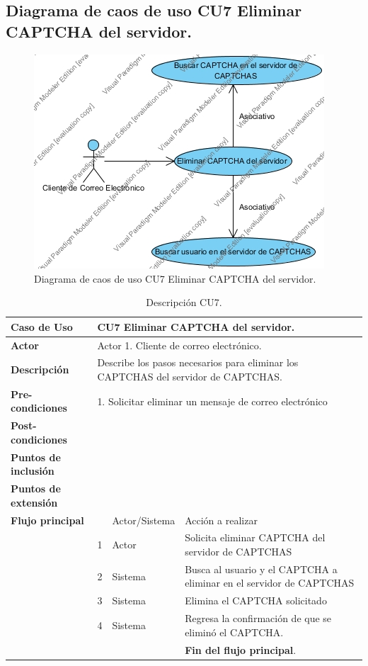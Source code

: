 \subsection{Diagrama de caos de uso CU7 Eliminar CAPTCHA del servidor.}
\begin{figure}[H]
	\includegraphics[width=1\linewidth, height=8cm]{./images/casodeuso7.jpg}
	\caption{Diagrama de caos de uso CU7 Eliminar CAPTCHA del servidor.}
	\label{fig:4-8-1}
\end{figure}
\begin{table}[H]
 \centering
   {
     \begin{tabular}{| p{} | p{} |p{4cm}|p{5cm}|}
     \hline
     \textbf{Caso de Uso} &\multicolumn{3}{|l|}{CU7 Eliminar CAPTCHA del servidor.}\\
     \hline
     \textbf{Actor} & \multicolumn{3}{|l|}{Actor 1. Cliente de correo electrónico.}\\
     \hline
     \textbf{Descripción} & \multicolumn{3}{|p{10cm}|}{Describe los pasos necesarios para eliminar los CAPTCHAS del servidor de CAPTCHAS.}\\
     \hline
     \textbf{Pre-condiciones} & \multicolumn{3}{|l|}{1. Solicitar eliminar un mensaje de correo electrónico}\\
     \hline
     \textbf{Post-condiciones} & \multicolumn{3}{|l|}{}\\
     \hline
     \textbf{Puntos de inclusión} & \multicolumn{3}{|l|}{}\\
     \hline
     \textbf{Puntos de extensión} & \multicolumn{3}{|l|}{}\\
     \hline
     \textbf{Flujo principal} & & Actor/Sistema & Acción a realizar\\
     \hline
     & 1 & Actor & Solicita eliminar CAPTCHA del servidor de CAPTCHAS\\
     \hline
     & 2 & Sistema & Busca al usuario y el CAPTCHA a eliminar en el servidor de CAPTCHAS\\
     \hline
     & 3 & Sistema & Elimina el CAPTCHA solicitado\\
     \hline
     & 4 & Sistema & Regresa la confirmación de que se eliminó el CAPTCHA.\\
     \hline
     & & & \textbf{Fin del flujo principal}.\\
          
     \end{tabular}
    }
    \caption{Descripción CU7.}
    \label{tabla:CU7}
\end{table}


